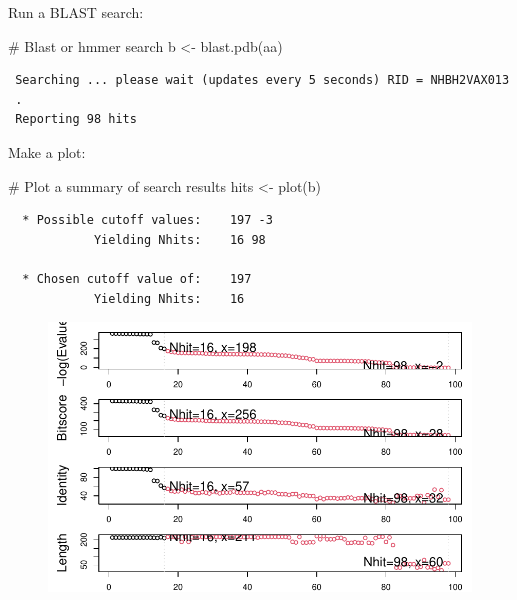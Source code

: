 \documentclass[
  letterpaper,
  DIV=11,
  numbers=noendperiod]{scrartcl}
\newenvironment{Shaded}{\begin{snugshade}}{\end{snugshade}}
\newcommand{\CommentTok}[1]{\textcolor[rgb]{0.37,0.37,0.37}{#1}}
\newcommand{\FunctionTok}[1]{\textcolor[rgb]{0.28,0.35,0.67}{#1}}
\newcommand{\NormalTok}[1]{\textcolor[rgb]{0.00,0.23,0.31}{#1}}
\newcommand{\OtherTok}[1]{\textcolor[rgb]{0.00,0.23,0.31}{#1}}
\begin{document}
Run a BLAST search:

\begin{Shaded}
\begin{Highlighting}[]
\CommentTok{\# Blast or hmmer search }
\NormalTok{b }\OtherTok{\textless{}{-}} \FunctionTok{blast.pdb}\NormalTok{(aa)}
\end{Highlighting}
\end{Shaded}

\begin{verbatim}
 Searching ... please wait (updates every 5 seconds) RID = NHBH2VAX013 
 .
 Reporting 98 hits
\end{verbatim}

Make a plot:

\begin{Shaded}
\begin{Highlighting}[]
\CommentTok{\# Plot a summary of search results}
\NormalTok{hits }\OtherTok{\textless{}{-}} \FunctionTok{plot}\NormalTok{(b)}
\end{Highlighting}
\end{Shaded}

\begin{verbatim}
  * Possible cutoff values:    197 -3 
            Yielding Nhits:    16 98 

  * Chosen cutoff value of:    197 
            Yielding Nhits:    16 
\end{verbatim}

\begin{figure}[H]

{\centering \includegraphics{Class09_html_files/figure-pdf/unnamed-chunk-9-1.pdf}

}

\end{figure}
\end{document}
